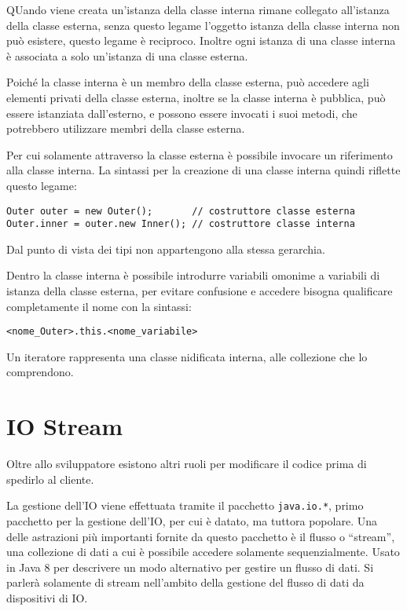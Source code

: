 \documentclass{article}
\numberwithin{equation}{subsection}
\begin{document}
QUando viene creata un'istanza della classe interna rimane collegato all'istanza della classe esterna, senza questo legame l'oggetto istanza della classe interna non può 
esistere, questo legame è reciproco. 
Inoltre ogni istanza di una classe interna è associata a solo un'istanza di una classe esterna.  

Poiché la classe interna è un membro della classe esterna, può accedere agli elementi privati della classe esterna, inoltre se la classe interna è pubblica, può essere istanziata 
dall'esterno, e possono essere invocati i suoi metodi, che potrebbero utilizzare membri della classe esterna. 

Per cui solamente attraverso la classe esterna è possibile invocare un riferimento alla classe interna. 
La sintassi per la creazione di una classe interna quindi riflette questo legame:
\begin{verbatim}
Outer outer = new Outer();       // costruttore classe esterna
Outer.inner = outer.new Inner(); // costruttore classe interna 
\end{verbatim}

Dal punto di vista dei tipi non appartengono alla stessa gerarchia. 

Dentro la classe interna è possibile introdurre variabili omonime a variabili di istanza della classe esterna, per evitare confusione e accedere bisogna qualificare 
completamente il nome con la sintassi:
\begin{verbatim}
<nome_Outer>.this.<nome_variabile>
\end{verbatim}


Un iteratore rappresenta una classe nidificata interna, alle collezione che lo comprendono. 


\clearpage

\section{IO Stream}

Oltre allo sviluppatore esistono altri ruoli per modificare il codice prima di spedirlo al cliente. 

La gestione dell'IO viene effettuata tramite il pacchetto \verb|java.io.*|, primo pacchetto per la gestione dell'IO, per cui è datato, ma tuttora popolare. 
Una delle astrazioni più importanti fornite da questo pacchetto è il flusso o ``stream'', una collezione di dati a cui è possibile accedere solamente sequenzialmente. 
Usato in Java 8 per descrivere un modo alternativo per gestire un flusso di dati. 
Si parlerà solamente di stream nell'ambito della gestione del flusso di dati da dispositivi di IO. 
\end{document}
